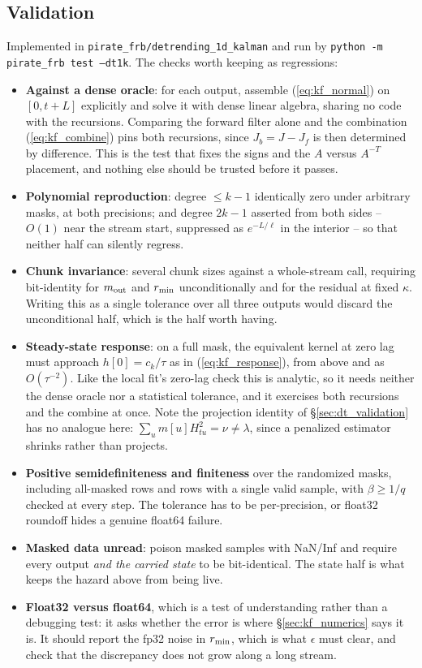 \documentclass{article}
\numberwithin{equation}{section}   %
\begin{document}
\subsection{Validation}
\label{sec:kf_validation}

Implemented in {\tt pirate\_frb/detrending\_1d\_kalman} and run by {\tt python -m pirate\_frb test --dt1k}.
The checks worth keeping as regressions:
\begin{itemize}
\item {\bf Against a dense oracle}: for each output, assemble (\ref{eq:kf_normal}) on $[0,t+L]$ explicitly and
solve it with dense linear algebra, sharing no code with the recursions.  Comparing the forward filter alone
and the combination (\ref{eq:kf_combine}) pins both recursions, since $J_b = J - J_f$ is then determined by
difference.  This is the test that fixes the signs and the $A$ versus $A^{-T}$ placement, and nothing else
should be trusted before it passes.
\item {\bf Polynomial reproduction}: degree $\le k-1$ identically zero under arbitrary masks, at both
precisions; and degree $2k-1$ asserted from both sides -- $O(1)$ near the stream start, suppressed as
$e^{-L/\ell}$ in the interior -- so that neither half can silently regress.
\item {\bf Chunk invariance}: several chunk sizes against a whole-stream call, requiring bit-identity for
$m_{\rm out}$ and $r_{\rm min}$ unconditionally and for the residual at fixed $\kappa$.  Writing this as a
single tolerance over all three outputs would discard the unconditional half, which is the half worth having.
\item {\bf Steady-state response}: on a full mask, the equivalent kernel at zero lag must approach
$h[0] = c_k/\tau$ as in (\ref{eq:kf_response}), from above and as $O(\tau^{-2})$.  Like the local fit's
zero-lag check this is analytic, so it needs neither the dense oracle nor a statistical tolerance, and it
exercises both recursions and the combine at once.  Note the projection identity of
\S\ref{sec:dt_validation} has no analogue here: $\sum_u m[u]H_{tu}^2 = \nu \ne \lambda$, since a penalized
estimator shrinks rather than projects.
\item {\bf Positive semidefiniteness and finiteness} over the randomized masks, including all-masked rows and
rows with a single valid sample, with $\beta \ge 1/q$ checked at every step.  The tolerance has to be
per-precision, or float32 roundoff hides a genuine float64 failure.
\item {\bf Masked data unread}: poison masked samples with NaN/Inf and require every output {\em and the
carried state} to be bit-identical.  The state half is what keeps the hazard above from being live.
\item {\bf Float32 versus float64}, which is a test of understanding rather than a debugging test: it asks
whether the error is where \S\ref{sec:kf_numerics} says it is.  It should report the fp32 noise in
$r_{\rm min}$, which is what $\epsilon$ must clear, and check that the discrepancy does not grow along a long
stream.
\end{itemize}
\end{document}
